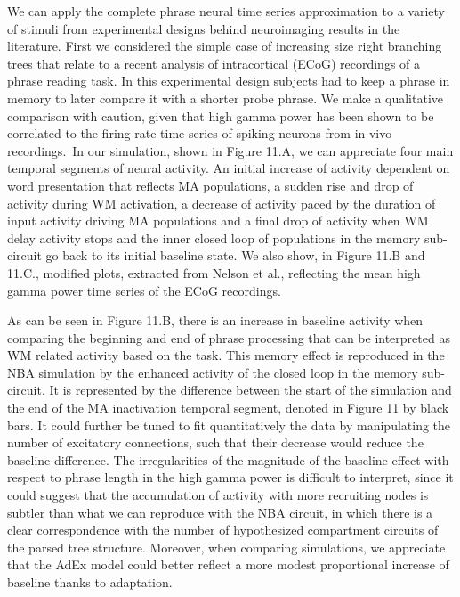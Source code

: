 \documentclass[10pt]{article}
\begin{document}
We can apply the complete phrase neural time series approximation to a
variety of stimuli from experimental designs behind neuroimaging
results in the literature. First we considered the simple case of
increasing size right branching trees that relate to a recent analysis
of intracortical (ECoG) recordings of a phrase reading
task\cite{Nelson_2017}. In this experimental design subjects had to
keep a phrase in memory to later compare it with a shorter probe
phrase. We make a qualitative comparison with caution, given that high
gamma power has been shown to be correlated to the firing rate time
series of spiking neurons from in-vivo recordings\cite{Ray_2011}.~In
our simulation, shown in Figure 11.A, we can appreciate four main
temporal segments of neural activity. An initial increase of activity
dependent on word presentation that reflects MA populations, a sudden
rise and drop of activity during WM activation, a decrease of activity
paced by the duration of input activity driving MA populations and a
final drop of activity when WM delay activity stops and the inner
closed loop of populations in the memory sub-circuit go back to its
initial baseline state. We also show, in Figure 11.B and 11.C.,
modified plots, extracted from Nelson et al., reflecting the mean high
gamma power time series of the ECoG recordings.

As can be seen in Figure 11.B, there is an increase in baseline
activity when comparing the beginning and end of phrase processing
that can be interpreted as WM related activity based on the task. This
memory effect is reproduced in the NBA simulation by the enhanced
activity of the closed loop in the memory sub-circuit. It is
represented by the difference between the start of the simulation and
the end of the MA inactivation temporal segment, denoted in Figure 11
by black bars. It could further be tuned to fit quantitatively the
data by manipulating the number of excitatory connections, such that
their decrease would reduce the baseline difference. The
irregularities of the magnitude of the baseline effect with respect to
phrase length in the high gamma power is difficult to interpret, since
it could suggest that the accumulation of activity with more
recruiting nodes is subtler than what we can reproduce with the NBA
circuit, in which there is a clear correspondence with the number of
hypothesized compartment circuits of the parsed tree structure.
Moreover, when comparing simulations, we appreciate that the AdEx
model could better reflect a more modest proportional increase of
baseline thanks to adaptation.~
\end{document}
